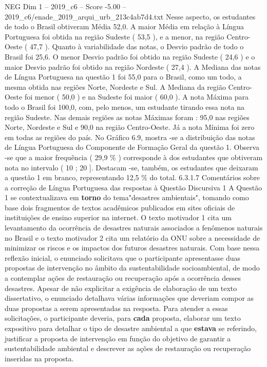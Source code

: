 \begin{textsample}{NEG Dim 1 – 2019\_c6 – Score -5.00 – 2019\_c6/enade\_2019\_arqui\_urb\_213c4ab7d4.txt}
Nesse aspecto, os estudantes de todo o Brasil obtiveram Média 52,0.
A maior Média em relação à Língua Portuguesa foi obtida na região Sudeste ( 53,5 ), e a menor, na região Centro-Oeste ( 47,7 ).
Quanto à variabilidade das notas, o Desvio padrão de todo o Brasil foi 25,6.
O menor Desvio padrão foi obtido na região Sudeste ( 24,6 ) e o maior Desvio padrão foi obtido na região Nordeste ( 27,4 ).
A Mediana das notas de Língua Portuguesa na questão 1 foi 55,0 para o Brasil, como um todo, a mesma obtida nas regiões Norte, Nordeste e Sul.
A Mediana da região Centro-Oeste foi menor ( 50,0 ) e na Sudeste foi maior ( 60,0 ).
A nota Máxima para todo o Brasil foi 100,0, com, pelo menos, um estudante tirando essa nota na região Sudeste.
Nas demais regiões as notas Máximas foram : 95,0 nas regiões Norte, Nordeste e Sul e 90,0 na região Centro-Oeste.
Já a nota Mínima foi zero em todas as regiões do país.
No Gráfico 6.9, mostra -se a distribuição das notas de Língua Portuguesa do Componente de Formação Geral da questão 1.
Observa -se que a maior frequência ( 29,9 \% ) corresponde à dos estudantes que obtiveram nota no intervalo ( 10 ; 20 ].
Destacam -se, também, os estudantes que deixaram a questão 1 em branco, representando 12,5 \% do total. 6.3.1.7 Comentários sobre a correção de Língua Portuguesa das respostas à Questão Discursiva 1 A Questão 1 se contextualizava em \textbf{torno} do tema"desastres ambientais", tomando como base dois fragmentos de textos acadêmicos publicados em sites oficiais de instituições de ensino superior na internet.
O texto motivador 1 cita um levantamento da ocorrência de desastres naturais associados a fenômenos naturais no Brasil e o texto motivador 2 cita um relatório da ONU sobre a necessidade de minimizar os riscos e os impactos dos futuros desastres naturais.
Com base nessa reflexão inicial, o enunciado solicitava que o participante apresentasse duas propostas de intervenção no âmbito da sustentabilidade socioambiental, de modo a contemplar ações de restauração ou recuperação após a ocorrência desses desastres.
Apesar de não explicitar a exigência de elaboração de um texto dissertativo, o enunciado detalhava várias informações que deveriam compor as duas propostas a serem apresentadas na resposta.
Para atender a essas solicitações, o participante deveria, para \textbf{cada} proposta, elaborar um texto expositivo para detalhar o tipo de desastre ambiental a que \textbf{estava} se referindo, justificar a proposta de intervenção em função do objetivo de garantir a sustentabilidade ambiental e descrever as ações de restauração ou recuperação inseridas na proposta.

\end{textsample}
